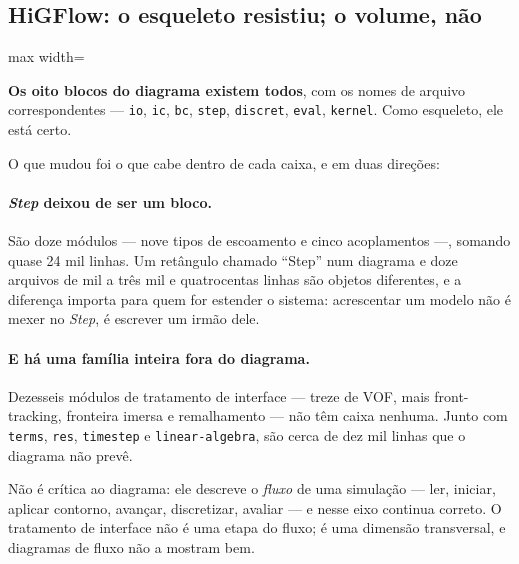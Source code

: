 \subsection{HiGFlow: o esqueleto resistiu; o volume, n\~ao}

\begin{adjustbox}{max width=\linewidth}
\end{adjustbox}

\textbf{Os oito blocos do diagrama existem todos}, com os nomes de arquivo
correspondentes --- \texttt{io}, \texttt{ic}, \texttt{bc}, \texttt{step},
\texttt{discret}, \texttt{eval}, \texttt{kernel}. Como esqueleto, ele est\'a
certo.

O que mudou foi o que cabe dentro de cada caixa, e em duas dire\c{c}\~oes:

\paragraph{\emph{Step} deixou de ser um bloco.} S\~ao doze m\'odulos --- nove
tipos de escoamento e cinco acoplamentos ---, somando quase 24 mil linhas. Um
ret\^angulo chamado ``Step'' num diagrama e doze arquivos de mil a tr\^es mil e
quatrocentas linhas s\~ao objetos diferentes, e a diferen\c{c}a importa para
quem for estender o sistema: acrescentar um modelo n\~ao \'e mexer no
\emph{Step}, \'e escrever um irm\~ao dele.

\paragraph{E h\'a uma fam\'ilia inteira fora do diagrama.} Dezesseis m\'odulos de
tratamento de interface --- treze de VOF, mais front-tracking, fronteira imersa e
remalhamento --- n\~ao t\^em caixa nenhuma. Junto com \texttt{terms},
\texttt{res}, \texttt{timestep} e \texttt{linear-algebra}, s\~ao cerca de dez mil
linhas que o diagrama n\~ao prev\^e.

N\~ao \'e cr\'itica ao diagrama: ele descreve o \emph{fluxo} de uma
simula\c{c}\~ao --- ler, iniciar, aplicar contorno, avan\c{c}ar, discretizar,
avaliar --- e nesse eixo continua correto. O tratamento de interface n\~ao \'e
uma etapa do fluxo; \'e uma dimens\~ao transversal, e diagramas de fluxo n\~ao a
mostram bem.

